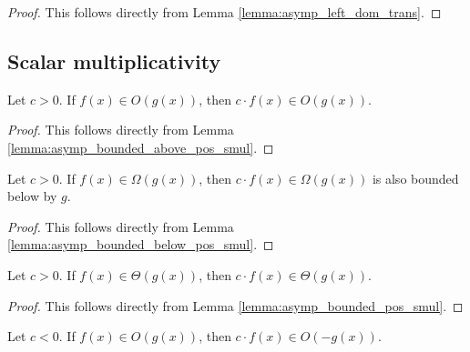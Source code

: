 \begin{proof}
    \leanok
    This follows directly from Lemma \ref{lemma:asymp_left_dom_trans}.
\end{proof}


\subsection{Scalar multiplicativity}

\begin{lemma}
    \label{lemma:O_pos_smul}
    \leanok
    Let $c > 0$. If $f(x) \in O(g(x))$, then $c \cdot f(x) \in O(g(x))$.
\end{lemma}

\begin{proof}
    \leanok
    This follows directly from Lemma \ref{lemma:asymp_bounded_above_pos_smul}.
\end{proof}

\begin{lemma}
    \label{lemma:Omega_pos_smul}
    \leanok
    Let $c > 0$. If $f(x) \in \Omega(g(x))$, then $c \cdot f(x) \in \Omega(g(x))$ is also bounded
    below by $g$.
\end{lemma}

\begin{proof}
    \leanok
    This follows directly from Lemma \ref{lemma:asymp_bounded_below_pos_smul}.
\end{proof}

\begin{lemma}
    \label{lemma:theta_pos_smul}
    \leanok
    Let $c > 0$. If $f(x) \in \Theta(g(x))$, then $c \cdot f(x) \in \Theta(g(x))$.
\end{lemma}

\begin{proof}
    \leanok
    This follows directly from Lemma \ref{lemma:asymp_bounded_pos_smul}.
\end{proof}

\begin{lemma}
    \label{lemma:O_neg_smul}
    \leanok
    Let $c < 0$. If $f(x) \in O(g(x))$, then $c \cdot f(x) \in O(-g(x))$.
\end{lemma}

